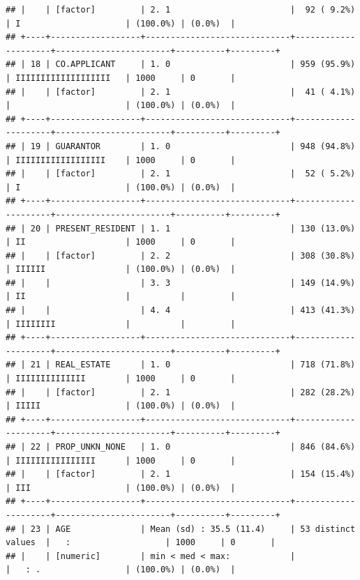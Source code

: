 \documentclass[
]{article}
\begin{document}
\begin{verbatim}
## |    | [factor]         | 2. 1                        |  92 ( 9.2%)         | I                     | (100.0%) | (0.0%)  |
## +----+------------------+-----------------------------+---------------------+-----------------------+----------+---------+
## | 18 | CO.APPLICANT     | 1. 0                        | 959 (95.9%)         | IIIIIIIIIIIIIIIIIII   | 1000     | 0       |
## |    | [factor]         | 2. 1                        |  41 ( 4.1%)         |                       | (100.0%) | (0.0%)  |
## +----+------------------+-----------------------------+---------------------+-----------------------+----------+---------+
## | 19 | GUARANTOR        | 1. 0                        | 948 (94.8%)         | IIIIIIIIIIIIIIIIII    | 1000     | 0       |
## |    | [factor]         | 2. 1                        |  52 ( 5.2%)         | I                     | (100.0%) | (0.0%)  |
## +----+------------------+-----------------------------+---------------------+-----------------------+----------+---------+
## | 20 | PRESENT_RESIDENT | 1. 1                        | 130 (13.0%)         | II                    | 1000     | 0       |
## |    | [factor]         | 2. 2                        | 308 (30.8%)         | IIIIII                | (100.0%) | (0.0%)  |
## |    |                  | 3. 3                        | 149 (14.9%)         | II                    |          |         |
## |    |                  | 4. 4                        | 413 (41.3%)         | IIIIIIII              |          |         |
## +----+------------------+-----------------------------+---------------------+-----------------------+----------+---------+
## | 21 | REAL_ESTATE      | 1. 0                        | 718 (71.8%)         | IIIIIIIIIIIIII        | 1000     | 0       |
## |    | [factor]         | 2. 1                        | 282 (28.2%)         | IIIII                 | (100.0%) | (0.0%)  |
## +----+------------------+-----------------------------+---------------------+-----------------------+----------+---------+
## | 22 | PROP_UNKN_NONE   | 1. 0                        | 846 (84.6%)         | IIIIIIIIIIIIIIII      | 1000     | 0       |
## |    | [factor]         | 2. 1                        | 154 (15.4%)         | III                   | (100.0%) | (0.0%)  |
## +----+------------------+-----------------------------+---------------------+-----------------------+----------+---------+
## | 23 | AGE              | Mean (sd) : 35.5 (11.4)     | 53 distinct values  |   :                   | 1000     | 0       |
## |    | [numeric]        | min < med < max:            |                     |   : .                 | (100.0%) | (0.0%)  |

\end{verbatim}
\end{document}
